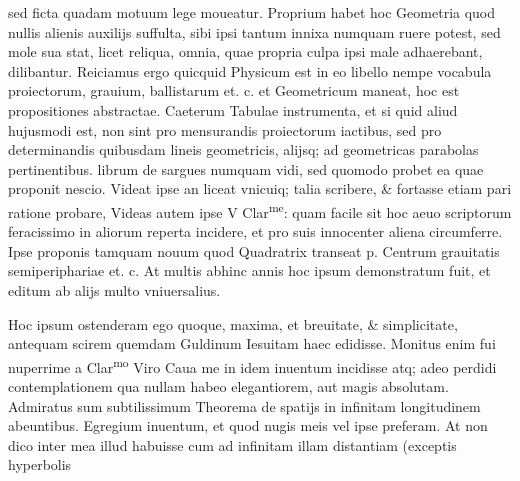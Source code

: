 \documentclass[11pt,a4paper]{article}
\begin{document}
sed ficta quadam motuum lege moueatur. Proprium habet hoc Geometria quod nullis alienis auxilijs suffulta, sibi ipsi tantum innixa numquam ruere potest, sed mole sua stat, licet reliqua, omnia, quae propria culpa ipsi male adhaerebant, dilibantur. Reiciamus ergo quicquid Physicum est in eo libello nempe vocabula proiectorum, grauium, ballistarum et. c. et Geometricum maneat, hoc est propositiones abstractae. Caeterum Tabulae instrumenta, et si quid aliud hujusmodi est, non sint pro mensurandis proiectorum iactibus, sed pro determinandis quibusdam lineis geometricis, alijsq; ad geometricas parabolas pertinentibus. librum de sargues numquam vidi, sed quomodo probet ea quae proponit nescio. Videat ipse an liceat vnicuiq; talia scribere, \& fortasse etiam pari ratione probare, Videas autem ipse V Clar\textsuperscript{me}: quam facile sit hoc aeuo scriptorum feracissimo in aliorum reperta incidere, et pro suis innocenter aliena circumferre. Ipse proponis tamquam nouum quod Quadratrix transeat p. Centrum grauitatis semiperiphariae et. c. At multis abhinc annis hoc ipsum demonstratum fuit, et editum ab alijs multo vniuersalius.

Hoc ipsum ostenderam ego quoque, maxima, et breuitate, \& simplicitate, antequam scirem quemdam Guldinum Iesuitam haec edidisse. Monitus enim fui nuperrime a Clar\textsuperscript{mo} Viro Caua me in idem inuentum incidisse atq; adeo perdidi contemplationem qua nullam habeo elegantiorem, aut magis absolutam. Admiratus sum subtilissimum Theorema de spatijs in infinitam longitudinem abeuntibus. Egregium inuentum, et quod nugis meis vel ipse preferam. At non dico inter mea illud habuisse cum ad infinitam illam distantiam (exceptis hyperbolis

\end{document}
